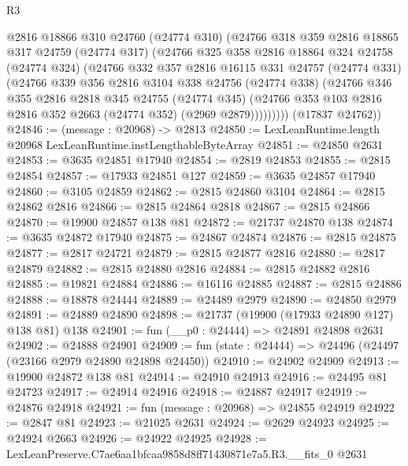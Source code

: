 \begin{lexlean}{R3}
\begin{coremodule}
          @2816
          @18866
          @310
          @24760
          (@24774 @310)
          (@24766
            @318
            @359
            @2816
            @18865
            @317
            @24759
            (@24774 @317)
            (@24766
              @325
              @358
              @2816
              @18864
              @324
              @24758
              (@24774 @324)
              (@24766
                @332
                @357
                @2816
                @16115
                @331
                @24757
                (@24774 @331)
                (@24766
                  @339
                  @356
                  @2816
                  @3104
                  @338
                  @24756
                  (@24774 @338)
                  (@24766
                    @346
                    @355
                    @2816
                    @2818
                    @345
                    @24755
                    (@24774 @345)
                    (@24766 @353 @103 @2816 @2816 @352 @2663 (@24774 @352) (@2969 @2879)))))))))
      (@17837 @24762))
@24846 := (message : @20968) -> @2813
@24850 := LexLeanRuntime.length @20968 LexLeanRuntime.instLengthableByteArray
@24851 := @24850 @2631
@24853 := @3635 @24851 @17940
@24854 := @2819 @24853
@24855 := @2815 @24854
@24857 := @17933 @24851 @127
@24859 := @3635 @24857 @17940
@24860 := @3105 @24859
@24862 := @2815 @24860 @3104
@24864 := @2815 @24862 @2816
@24866 := @2815 @24864 @2818
@24867 := @2815 @24866
@24870 := @19900 @24857 @138 @81
@24872 := @21737 @24870 @138
@24874 := @3635 @24872 @17940
@24875 := @24867 @24874
@24876 := @2815 @24875
@24877 := @2817 @24721
@24879 := @2815 @24877 @2816
@24880 := @2817 @24879
@24882 := @2815 @24880 @2816
@24884 := @2815 @24882 @2816
@24885 := @19821 @24884
@24886 := @16116 @24885
@24887 := @2815 @24886
@24888 := @18878 @24444
@24889 := @24489 @2979
@24890 := @24850 @2979
@24891 := @24889 @24890
@24898 := @21737 (@19900 (@17933 @24890 @127) @138 @81) @138
@24901 := fun (__p0 : @24444) => @24891 @24898 @2631
@24902 := @24888 @24901
@24909 := fun (state : @24444) => @24496 (@24497 (@23166 @2979 @24890 @24898 @24450))
@24910 := @24902 @24909
@24913 := @19900 @24872 @138 @81
@24914 := @24910 @24913
@24916 := @24495 @81 @24723
@24917 := @24914 @24916
@24918 := @24887 @24917
@24919 := @24876 @24918
@24921 := fun (message : @20968) => @24855 @24919
@24922 := @2847 @81
@24923 := @21025 @2631
@24924 := @2629 @24923
@24925 := @24924 @2663
@24926 := @24922 @24925
@24928 := LexLeanPreserve.C7ae6aa1bfcaa9858d8ff71430871e7a5.R3.__fits_0 @2631

\end{coremodule}
\end{lexlean}
